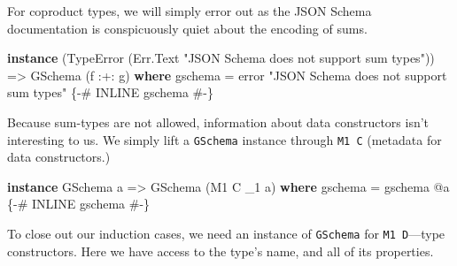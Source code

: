 \documentclass[
  11pt,
]{book}
\newenvironment{Shaded}{}{}
\newcommand{\DataTypeTok}[1]{\textcolor[rgb]{0.56,0.13,0.00}{#1}}
\newcommand{\FunctionTok}[1]{\textcolor[rgb]{0.02,0.16,0.49}{#1}}
\newcommand{\KeywordTok}[1]{\textcolor[rgb]{0.00,0.44,0.13}{\textbf{#1}}}
\newcommand{\NormalTok}[1]{#1}
\newcommand{\OperatorTok}[1]{\textcolor[rgb]{0.40,0.40,0.40}{#1}}
\newcommand{\OtherTok}[1]{\textcolor[rgb]{0.00,0.44,0.13}{#1}}
\newcommand{\StringTok}[1]{\textcolor[rgb]{0.25,0.44,0.63}{#1}}
\theoremstyle{nonumberplain}
\begin{document}
For coproduct types, we will simply error out as the JSON Schema
documentation is conspicuously quiet about the encoding of sums.

\begin{Shaded}
\begin{Highlighting}[]
\KeywordTok{instance}
\NormalTok{  (}\DataTypeTok{TypeError}\NormalTok{ (}\DataTypeTok{\textquotesingle{}Err.Text}
      \StringTok{"JSON Schema does not support sum types"}\NormalTok{))}
    \OtherTok{=\textgreater{}} \DataTypeTok{GSchema}\NormalTok{ (f }\OperatorTok{:+:}\NormalTok{ g) }\KeywordTok{where}
\NormalTok{  gschema }\OtherTok{=}
    \FunctionTok{error}
      \StringTok{"JSON Schema does not support sum types"}
  \OtherTok{\{{-}\# INLINE gschema \#{-}\}}
\end{Highlighting}
\end{Shaded}

Because sum-types are not allowed, information about data constructors
isn't interesting to us. We simply lift a \texttt{GSchema} instance
through \texttt{M1\ C} (metadata for data constructors.)

\begin{Shaded}
\begin{Highlighting}[]
\KeywordTok{instance} \DataTypeTok{GSchema}\NormalTok{ a }\OtherTok{=\textgreater{}} \DataTypeTok{GSchema}\NormalTok{ (}\DataTypeTok{M1} \DataTypeTok{C}\NormalTok{ \_1 a) }\KeywordTok{where}
\NormalTok{  gschema }\OtherTok{=}\NormalTok{ gschema }\OperatorTok{@}\NormalTok{a}
  \OtherTok{\{{-}\# INLINE gschema \#{-}\}}
\end{Highlighting}
\end{Shaded}

To close out our induction cases, we need an instance of
\texttt{GSchema} for \texttt{M1\ D}---type constructors. Here we have
access to the type's name, and all of its properties.

\begin{Shaded}
\end{Shaded}
\end{document}
